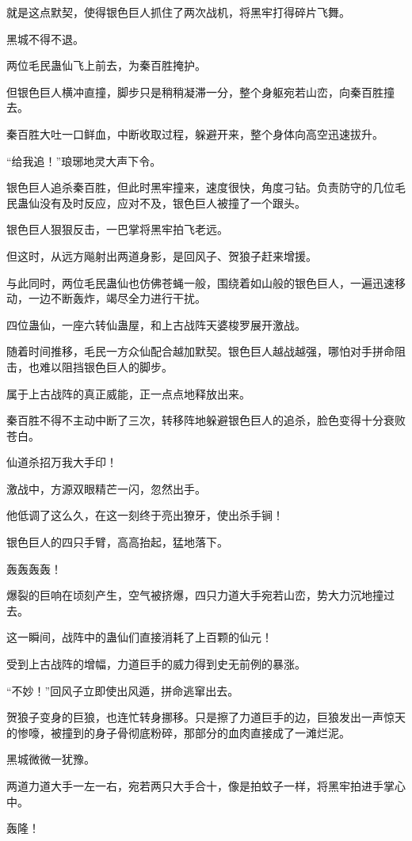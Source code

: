 \begin{this_body}
就是这点默契，使得银色巨人抓住了两次战机，将黑牢打得碎片飞舞。

黑城不得不退。

两位毛民蛊仙飞上前去，为秦百胜掩护。

但银色巨人横冲直撞，脚步只是稍稍凝滞一分，整个身躯宛若山峦，向秦百胜撞去。

秦百胜大吐一口鲜血，中断收取过程，躲避开来，整个身体向高空迅速拔升。

“给我追！”琅琊地灵大声下令。

银色巨人追杀秦百胜，但此时黑牢撞来，速度很快，角度刁钻。负责防守的几位毛民蛊仙没有及时反应，应对不及，银色巨人被撞了一个跟头。

银色巨人狠狠反击，一巴掌将黑牢拍飞老远。

但这时，从远方飚射出两道身影，是回风子、贺狼子赶来增援。

与此同时，两位毛民蛊仙也仿佛苍蝇一般，围绕着如山般的银色巨人，一遍迅速移动，一边不断轰炸，竭尽全力进行干扰。

四位蛊仙，一座六转仙蛊屋，和上古战阵天婆梭罗展开激战。

随着时间推移，毛民一方众仙配合越加默契。银色巨人越战越强，哪怕对手拼命阻击，也难以阻挡银色巨人的脚步。

属于上古战阵的真正威能，正一点点地释放出来。

秦百胜不得不主动中断了三次，转移阵地躲避银色巨人的追杀，脸色变得十分衰败苍白。

仙道杀招万我大手印！

激战中，方源双眼精芒一闪，忽然出手。

他低调了这么久，在这一刻终于亮出獠牙，使出杀手锏！

银色巨人的四只手臂，高高抬起，猛地落下。

轰轰轰轰！

爆裂的巨响在顷刻产生，空气被挤爆，四只力道大手宛若山峦，势大力沉地撞过去。

这一瞬间，战阵中的蛊仙们直接消耗了上百颗的仙元！

受到上古战阵的增幅，力道巨手的威力得到史无前例的暴涨。

“不妙！”回风子立即使出风遁，拼命逃窜出去。

贺狼子变身的巨狼，也连忙转身挪移。只是擦了力道巨手的边，巨狼发出一声惊天的惨嚎，被撞到的身子骨彻底粉碎，那部分的血肉直接成了一滩烂泥。

黑城微微一犹豫。

两道力道大手一左一右，宛若两只大手合十，像是拍蚊子一样，将黑牢拍进手掌心中。

轰隆！


\end{this_body}
